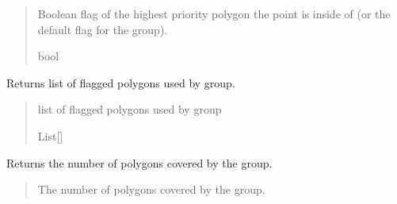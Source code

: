 \documentclass[letterpaper,10pt,english]{sphinxmanual}
\begin{document}
\begin{fulllineitems}
\begin{fulllineitems}
\begin{quote}
\begin{description}
\sphinxAtStartPar
Boolean flag of the highest priority polygon the point is
inside of (or the default flag for the group).

\sphinxAtStartPar
bool

\end{description}\end{quote}

\end{fulllineitems}


\begin{fulllineitems}
\label{\detokenize{modules/gps/zones:qnav.gps.zones.FlaggedPolygonGroup.polygons}}
\pysigstartsignatures
{}
\pysigstopsignatures
\sphinxAtStartPar
Returns list of flagged polygons used by group.
\begin{quote}\begin{description}
\sphinxAtStartPar
list of flagged polygons used by group

\sphinxAtStartPar
List{[}{\hyperref[\detokenize{modules/gps/zones:qnav.gps.zones.FlaggedPolygon}]{}}{]}

\end{description}\end{quote}

\end{fulllineitems}


\begin{fulllineitems}
\label{\detokenize{modules/gps/zones:qnav.gps.zones.FlaggedPolygonGroup.num_polygons}}
\pysigstartsignatures
{}
\pysigstopsignatures
\sphinxAtStartPar
Returns the number of polygons covered by the group.
\begin{quote}\begin{description}
\sphinxAtStartPar
The number of polygons covered by the group.


\end{description}
\end{quote}
\end{fulllineitems}
\end{fulllineitems}
\end{document}
